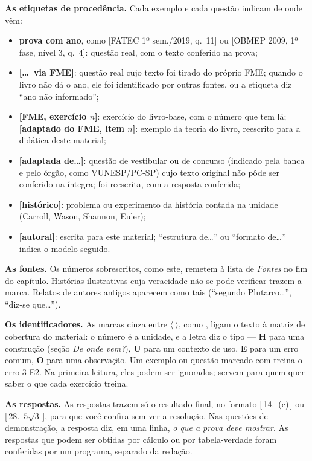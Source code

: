 \textbf{As etiquetas de procedência.} Cada exemplo e cada questão indicam de onde vêm:
\begin{itemize}[leftmargin=1.4em,itemsep=1pt]
  \item \textbf{prova com ano}, como [FATEC 1º sem./2019, q.~11] ou [OBMEP 2009, 1ª fase, nível 3, q.~4]: questão real, com o texto conferido na prova;
  \item \textbf{[\ldots\ via FME]}: questão real cujo texto foi tirado do próprio FME; quando o livro não dá o ano, ele foi identificado por outras fontes, ou a etiqueta diz \enquote{ano não informado};
  \item \textbf{[FME, exercício $n$]}: exercício do livro-base, com o número que tem lá; \textbf{[adaptado do FME, item $n$]}: exemplo da teoria do livro, reescrito para a didática deste material;
  \item \textbf{[adaptada de\ldots]}: questão de vestibular ou de concurso (indicado pela banca e pelo órgão, como VUNESP/PC-SP) cujo texto original não pôde ser conferido na íntegra; foi reescrita, com a resposta conferida;
  \item \textbf{[histórico]}: problema ou experimento da história contada na unidade (Carroll, Wason, Shannon, Euler);
  \item \textbf{[autoral]}: escrita para este material; \enquote{estrutura de\ldots} ou \enquote{formato de\ldots} indica o modelo seguido.
\end{itemize}

\textbf{As fontes.} Os números sobrescritos, como este, remetem à lista de \emph{Fontes} no fim do capítulo. Histórias ilustrativas cuja veracidade não se pode verificar trazem a marca\anedota. Relatos de autores antigos aparecem como tais (\enquote{segundo Plutarco\ldots}, \enquote{diz-se que\ldots}).

\textbf{Os identificadores.} As marcas cinza entre $\langle\ \rangle$, como , ligam o texto à matriz de cobertura do material: o número é a unidade, e a letra diz o tipo — \textbf{H} para uma construção (seção \emph{De onde vem?}), \textbf{U} para um contexto de uso, \textbf{E} para um erro comum, \textbf{O} para uma observação. Um exemplo ou questão marcado com  treina o erro 3-E2. Na primeira leitura, eles podem ser ignorados; servem para quem quer saber o que cada exercício treina.

\textbf{As respostas.} As respostas trazem só o resultado final, no formato [\,14.\ (c)\,] ou [\,28.\ $5\sqrt3$\,], para que você confira sem ver a resolução. Nas questões de demonstração, a resposta diz, em uma linha, \emph{o que a prova deve mostrar}. As respostas que podem ser obtidas por cálculo ou por tabela-verdade foram conferidas por um programa, separado da redação.
\clearpage
